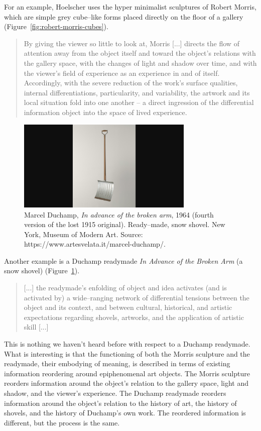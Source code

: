\documentclass[letterpaper]{article}
\begin{document}
    For an example, Hoelscher uses the hyper minimalist sculptures of Robert Morris, which are simple grey cube–like forms placed directly on the floor of a gallery (Figure~\ref{fig:robert-morris-cubes}).

    \begin{quote}
        By giving the viewer so little to look at, Morris [...] directs the flow of attention away from the object itself and toward the object's relations with the gallery space, with the changes of light and shadow over time, and with the viewer's field of experience as an experience in and of itself. Accordingly, with the severe reduction of the work's surface qualities, internal differentiations, particularity, and variability, the artwork and its local situation fold into one another – a direct ingression of the differential information object into the space of lived experience. \citep[p.78]{HoelscherArtAsInfrmtn2021}
    \end{quote}

    \begin{figure}[h]
        \includegraphics[width=3.31in]{snow-shovel.png}
        \caption{Marcel Duchamp, \emph{In advance of the broken arm}, 1964 (fourth version of the lost 1915 original). Ready–made, snow shovel. New York, Museum of Modern Art. Source: https://www.artesvelata.it/marcel-duchamp/.}
        \label{fig:snow-shovel}
    \end{figure}

    Another example is a Duchamp readymade \emph{In Advance of the Broken Arm} (a snow shovel) (Figure~\ref{fig:snow-shovel}).

    \begin{quote}
        [...] the readymade's enfolding of object and idea activates (and is activated by) a wide–ranging network of differential tensions between the object and its context, and between cultural, historical, and artistic expectations regarding shovels, artworks, and the application of artistic skill [...]
    \end{quote}

    This is nothing we haven't heard before with respect to a Duchamp readymade. What is interesting is that the functioning of both the Morris sculpture and the readymade, their embodying of meaning, is described in terms of existing information reordering around epiphenomenal art objects. The Morris sculpture reorders information around the object's relation to the gallery space, light and shadow, and the viewer's experience. The Duchamp readymade reorders information around the object's relation to the history of art, the history of shovels, and the history of Duchamp's own work. The reordered information is different, but the process is the same.
\end{document}
